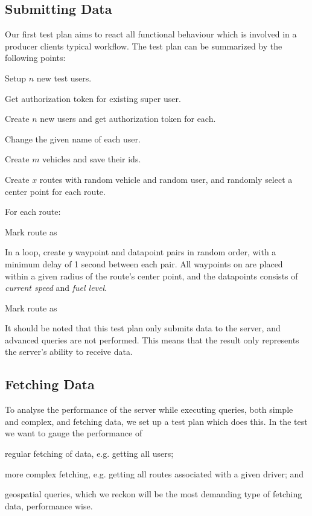 \subsection{Submitting Data}
Our first test plan aims to react all functional behaviour which is involved in a producer clients typical workflow.
The test plan can be summarized by the following points:
\begin{enumberate}
    \item Setup $n$ new test users.
    \begin{enumberate}
        \item Get authorization token for existing super user.
        \item Create $n$ new users and get authorization token for each.
        \item Change the given name of each user.
    \end{enumberate}
    \item Create $m$ vehicles and save their ids.
    \item Create $x$ routes with random vehicle and random user, and randomly select a center point for each route.
    \item For each route:
    \begin{enumberate}
        \item Mark route as 
        \item In a loop, create $y$ waypoint and datapoint pairs in random order, with a minimum delay of 1 second between each pair.
              All waypoints on are placed within a given radius of the route's center point, and the datapoints consists of \textit{current speed} and \textit{fuel level}.
        \item Mark route as 
    \end{enumberate}
\end{enumberate}

It should be noted that this test plan only submits data to the server, and advanced queries are not performed.
This means that the result only represents the server's ability to receive data.

\subsection{Fetching Data}
To analyse the performance of the server while executing queries, both simple and complex, and fetching data, we set up a test plan which does this.
In the test we want to gauge the performance of
\begin{enumberate*}
    \item regular fetching of data, e.g. getting all users;
    \item more complex fetching, e.g. getting all routes associated with a given driver; and
    \item geospatial queries, which we reckon will be the most demanding type of fetching data, performance wise.
\end{enumberate*}



